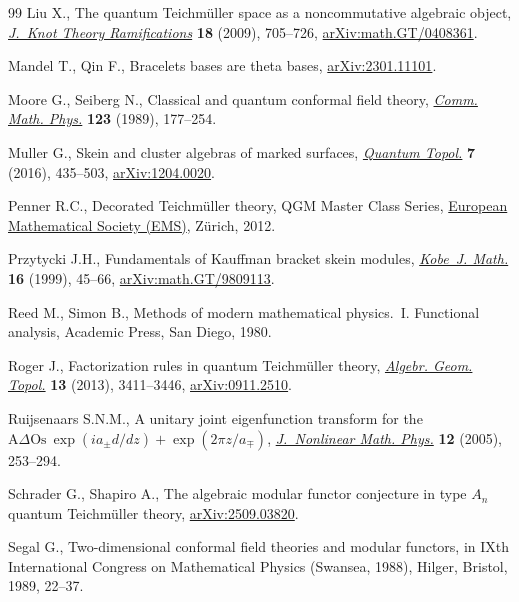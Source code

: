\begin{thebibliography}{99}
Liu X., The quantum {T}eichm\"{u}ller space as a noncommutative algebraic
 object, \href{https://doi.org/10.1142/S0218216509007129}{\textit{J.~Knot
 Theory Ramifications}} \textbf{18} (2009), 705--726,
 \href{http://arxiv.org/abs/math.GT/0408361}{arXiv:math.GT/0408361}.

Mandel T., Qin F., Bracelets bases are theta bases,
 \href{http://arxiv.org/abs/2301.11101}{arXiv:2301.11101}.

Moore G., Seiberg N., Classical and quantum conformal field theory,
 \href{https://doi.org/10.1007/BF01238857}{\textit{Comm. Math. Phys.}}
 \textbf{123} (1989), 177--254.

Muller G., Skein and cluster algebras of marked surfaces,
 \href{https://doi.org/10.4171/QT/79}{\textit{Quantum Topol.}} \textbf{7}
 (2016), 435--503, \href{http://arxiv.org/abs/1204.0020}{arXiv:1204.0020}.

Penner R.C., Decorated {T}eichm\"{u}ller theory, QGM Master Class Series,
 \href{https://doi.org/10.4171/075}{European Mathematical Society (EMS)},
 Z\"{u}rich, 2012.

Przytycki J.H., Fundamentals of {K}auffman bracket skein modules,
 \href{https://doi.org/10.24546/E0003677}{\textit{Kobe~J. Math.}} \textbf{16}
 (1999), 45--66,
 \href{http://arxiv.org/abs/math.GT/9809113}{arXiv:math.GT/9809113}.

Reed M., Simon B., Methods of modern mathematical physics.~{I}. {F}unctional
 analysis, Academic Press, San Diego, 1980.

Roger J., Factorization rules in quantum {T}eichm\"{u}ller theory,
 \href{https://doi.org/10.2140/agt.2013.13.3411}{\textit{Algebr. Geom.
 Topol.}} \textbf{13} (2013), 3411--3446,
 \href{http://arxiv.org/abs/0911.2510}{arXiv:0911.2510}.

Ruijsenaars S.N.M., A unitary joint eigenfunction transform for the {$\mathrm{
 A}\Delta \mathrm{Os}\ \exp(ia_\pm d/dz)+\exp(2\pi z/a_\mp)$},
 \href{https://doi.org/10.2991/jnmp.2005.12.s2.19}{\textit{J.~Nonlinear Math.
 Phys.}} \textbf{12} (2005), 253--294.

Schrader G., Shapiro A., The algebraic modular functor conjecture in type $A_n$
 quantum {T}eichm\"{u}ller theory,
 \href{http://arxiv.org/abs/2509.03820}{arXiv:2509.03820}.

Segal G., Two-dimensional conformal field theories and modular functors, in
 I{X}th {I}nternational {C}ongress on {M}athematical {P}hysics ({S}wansea,
 1988), Hilger, Bristol, 1989, 22--37.


\end{thebibliography}
